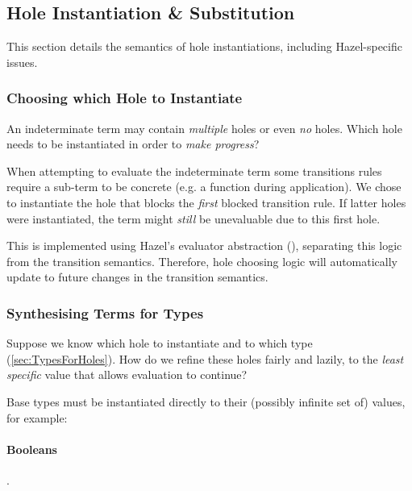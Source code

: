 \subsection{Hole Instantiation \& Substitution}\label{sec:HoleInstantiation}
This section details the semantics of hole instantiations, including Hazel-specific issues.

\subsubsection{Choosing which Hole to Instantiate}
\label{sec:ChooseHole}
An indeterminate term may contain \textit{multiple} holes or even \textit{no} holes. Which hole needs to be instantiated in order to \textit{make progress}?

When attempting to evaluate the indeterminate term some transitions rules require a sub-term to be concrete (e.g. a function during application). We chose to instantiate the hole that blocks the \textit{first} blocked transition rule. If latter holes were instantiated, the term might \textit{still} be unevaluable due to this first hole.

This is implemented using Hazel's evaluator abstraction (), separating this logic from the transition semantics. Therefore, hole choosing logic will automatically update to future changes in the transition semantics.

\subsubsection{Synthesising Terms for Types}
Suppose we know which hole to instantiate and to which type (\cref{sec:TypesForHoles}). How do we refine these holes fairly and lazily, to the \textit{least specific} value that allows evaluation to continue?

Base types must be instantiated directly to their (possibly infinite set of) values, for example:
\paragraph{Booleans} .
